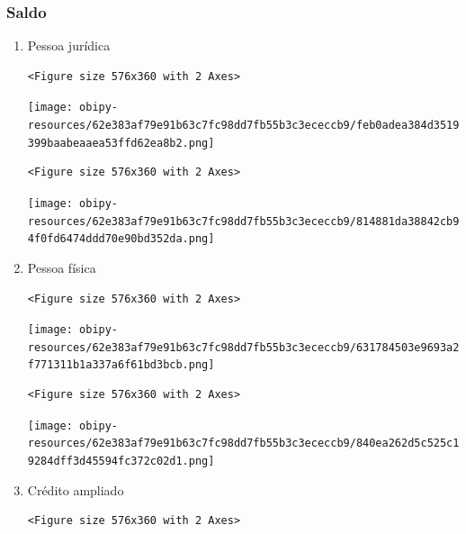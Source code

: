 \documentclass[11pt]{article}
\begin{document}
\subsubsection{Saldo}
\label{sec:orgd6b72ed}

\begin{enumerate}
\item Pessoa jurídica
\label{sec:orgca2c631}

\begin{verbatim}
<Figure size 576x360 with 2 Axes>
\end{verbatim}


\begin{center}
\texttt{[image: obipy-resources/62e383af79e91b63c7fc98dd7fb55b3c3ececcb9/feb0adea384d3519399baabeaaea53ffd62ea8b2.png]}
\end{center}


\begin{verbatim}
<Figure size 576x360 with 2 Axes>
\end{verbatim}


\begin{center}
\texttt{[image: obipy-resources/62e383af79e91b63c7fc98dd7fb55b3c3ececcb9/814881da38842cb94f0fd6474ddd70e90bd352da.png]}
\end{center}

\item Pessoa física
\label{sec:orgcf2c8fc}

\begin{verbatim}
<Figure size 576x360 with 2 Axes>
\end{verbatim}


\begin{center}
\texttt{[image: obipy-resources/62e383af79e91b63c7fc98dd7fb55b3c3ececcb9/631784503e9693a2f771311b1a337a6f61bd3bcb.png]}
\end{center}

\begin{verbatim}
<Figure size 576x360 with 2 Axes>
\end{verbatim}


\begin{center}
\texttt{[image: obipy-resources/62e383af79e91b63c7fc98dd7fb55b3c3ececcb9/840ea262d5c525c19284dff3d45594fc372c02d1.png]}
\end{center}

\item Crédito ampliado
\label{sec:orgea5075c}

\begin{verbatim}
<Figure size 576x360 with 2 Axes>
\end{verbatim}



\end{enumerate}
\end{document}
